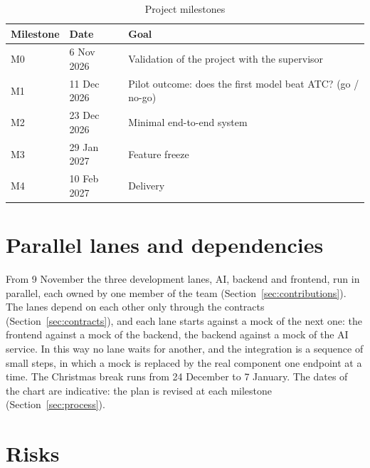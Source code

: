 \begin{table}[htpb]
  \centering
  \begin{tabular}{@{}llp{8cm}@{}}
    \toprule
    \textbf{Milestone} & \textbf{Date} & \textbf{Goal} \\
    \midrule
    M0 & 6 Nov 2026  & Validation of the project with the supervisor \\
    M1 & 11 Dec 2026 & Pilot outcome: does the first model beat ATC? (go / no-go) \\
    M2 & 23 Dec 2026 & Minimal end-to-end system \\
    M3 & 29 Jan 2027 & Feature freeze \\
    M4 & 10 Feb 2027 & Delivery \\
    \bottomrule
  \end{tabular}
  \caption{Project milestones}
  \label{tab:milestones}
\end{table}

\section{Parallel lanes and dependencies}
\label{sec:lanes}

From 9 November the three development lanes, AI, backend and frontend, run in parallel, each
owned by one member of the team (Section~\ref{sec:contributions}). The lanes depend on each
other only through the contracts (Section~\ref{sec:contracts}), and each lane starts against a
mock of the next one: the frontend against a mock of the backend, the backend against a mock of
the AI service. In this way no lane waits for another, and the integration is a sequence of
small steps, in which a mock is replaced by the real component one endpoint at a time. The
Christmas break runs from 24 December to 7 January. The dates of the chart are indicative: the
plan is revised at each milestone (Section~\ref{sec:process}).

\section{Risks}
\label{sec:risks}

